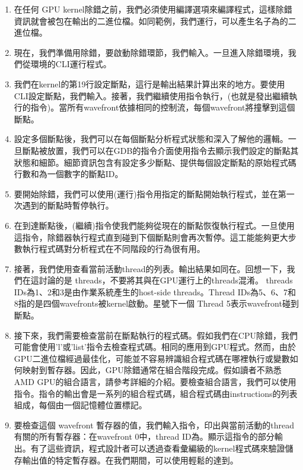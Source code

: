 \begin{enumerate}
    \item 在任何 GPU kernel除錯之前，我們必須使用編譯選項來編譯程式，這樣除錯資訊就會被包在輸出的二進位檔。如同範例，我們運行，可以產生名子為的二進位檔。
    \item 現在，我們準備用除錯，要啟動除錯環節，我們輸入。一旦進入除錯環境，我們從環境的CLI運行程式。
    \item 我們在kernel的第19行設定斷點，這行是輸出結果計算出來的地方。要使用 CLI設定斷點，我們輸入。接著，我們繼續使用指令執行，(也就是發出繼續執行的指令)。當所有wavefront依據相同的控制流，每個wavefront將撞擊到這個斷點。
    \item 設定多個斷點後，我們可以在每個斷點分析程式狀態和深入了解他的邏輯。一旦斷點被放置，我們可以在GDB的指令介面使用指令去顯示我們設定的斷點其狀態和細節。細節資訊包含有設定多少斷點、提供每個設定斷點的原始程式碼行數和為一個數字的斷點ID。
    \item 要開始除錯，我們可以使用(運行)指令用指定的斷點開始執行程式，並在第一次遇到的斷點時暫停執行。
    \item 在到達斷點後，(繼續)指令使我們能夠從現在的斷點恢復執行程式。一旦使用這指令，除錯器執行程式直到碰到下個斷點則會再次暫停。這工能能夠更大步數執行程式碼對分析程式在不同階段的行為很有用。
    \item 接著，我們使用查看當前活動thread的列表。輸出結果如同在。回想一下，我們在這討論的是 threads，不要將其與在GPU運行上的threads混淆。 threads IDs為1、2和3是由作業系統產生的host-side threads。Thread IDs為5、6、7和8指的是四個wavefronts被kernel啟動。星號下一個 Thread 5表示wavefront碰到斷點。
    \item 接下來，我們需要檢查當前在斷點執行的程式碼。假如我們在CPU除錯，我們可能會使用’l’或'list'指令去檢查程式碼。相同的應用到GPU程式。然而，由於GPU二進位檔經過最佳化，可能並不容易辨識組合程式碼在哪裡執行或變數如何映射到暫存器。因此，GPU除錯通常在組合階段完成。假如讀者不熟悉AMD GPU的組合語言，請參考詳細的介紹。要檢查組合語言，我們可以使用指令。指令的輸出會是一系列的組合程式碼，組合程式碼由instructions的列表組成，每個由一個記憶體位置標記。
    \item 要檢查這個 wavefront 暫存器的值，我們輸入指令，印出與當前活動的thread有關的所有暫存器：在wavefront 0中，thread ID為。顯示這指令的部分輸出。有了這些資訊，程式設計者可以透過查看彙編級的kernel程式碼來驗證儲存輸出值的特定暫存器。在我們期間，可以使用輕鬆的達到。


\end{enumerate}
